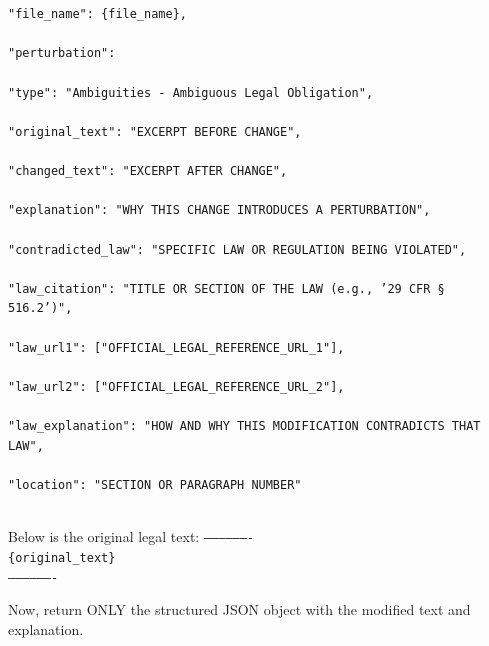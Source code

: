 \documentclass[11pt]{article}
\begin{document}
\begin{tcolorbox}[breakable,colback=lightestgray,colframe=black,title=\textbf{Ambiguity Legal Data Generation Prompt}]
{\small
\texttt{"file\_name": \{file\_name\},\\\\
"perturbation": \\\\
"type": "Ambiguities - Ambiguous Legal Obligation",\\\\
"original\_text": "EXCERPT BEFORE CHANGE",\\\\
"changed\_text": "EXCERPT AFTER CHANGE",\\\\
"explanation": "WHY THIS CHANGE INTRODUCES A PERTURBATION",\\\\
"contradicted\_law": "SPECIFIC LAW OR REGULATION BEING VIOLATED",\\\\
"law\_citation": "TITLE OR SECTION OF THE LAW (e.g., '29 CFR § 516.2')",\\\\
"law\_url1": ["OFFICIAL\_LEGAL\_REFERENCE\_URL\_1"],\\\\
"law\_url2": ["OFFICIAL\_LEGAL\_REFERENCE\_URL\_2"],\\\\
"law\_explanation": "HOW AND WHY THIS MODIFICATION CONTRADICTS THAT LAW",\\\\
"location": "SECTION OR PARAGRAPH NUMBER"\\\\}
}

Below is the original legal text:
\texttt{-------------------}\\
\texttt{\{original\_text\}}\\
\texttt{-------------------}

Now, return ONLY the structured JSON object with the modified text and explanation.
\end{tcolorbox}
\end{document}
